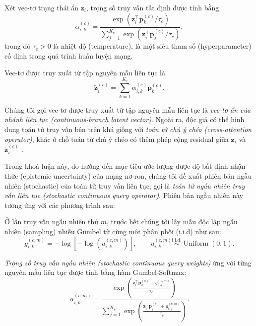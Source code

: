 Xét vec-tơ trạng thái ẩn \(\mathbf{z}_{i}\), trọng số truy vấn tất định được tính bằng
\begin{equation}
\alpha^{(c)}_{i,k}
=
\frac{
\exp\left(
\mathbf{z}_{i}^{\top}\mathbf{p}^{(c)}_k/\tau_c
\right)}
{
\sum_{j=1}^{K_c}
\exp\left(
\mathbf{z}_{i}^{\top}\mathbf{p}^{(c)}_j/\tau_c
\right)
},
\end{equation}
trong đó \(\tau_c>0\) là nhiệt độ (temperature), là một siêu tham số (hyperparameter) cố định trong quá trình huấn luyện mạng.

Vec-tơ được truy xuất từ tập nguyên mẫu liên tục là
\begin{equation}
\widetilde{\mathbf{z}}^{(c)}_{i}
=
\sum_{k=1}^{K_c}
\alpha^{(c)}_{i,k}\mathbf{p}^{(c)}_k.
\end{equation}

Chúng tôi gọi vec-tơ được truy xuất từ tập nguyên mẫu liên tục là \textit{vec-tơ ẩn của nhánh liên tục (continuous-branch latent vector)}. Ngoài ra, độc giả có thể hình dung toán tử truy vấn bên trên khá giống với \textit{toán tử chú ý chéo (cross-attention operator)}, khác ở chỗ toán tử chú ý chéo có thêm phép cộng residual giữa \(\mathbf{z}_{i}\) và \(\widetilde{\mathbf{z}}^{(c)}_{i}\) \cite{3295222.3295349} \cite{9859720}.

Trong khoá luận này, do hướng đến mục tiêu ước lượng được độ bất định nhận thức (epistemic uncertainty) của mạng nơ-ron, chúng tôi đề xuất phiên bản ngẫu nhiên (stochastic) của toán tử truy vấn liên tục, gọi là \textit{toán tử ngẫu nhiên truy vấn liên tục (stochastic continuous query operator)}. Phiên bản ngẫu nhiên này tương ứng với các phương trình sau:

Ở lần truy vấn ngẫu nhiên thứ \(m\), trước hết chúng tôi lấy mẫu độc lập ngẫu nhiên (sampling) nhiễu Gumbel từ cùng một phân phối (i.i.d) như sau:
\begin{equation}
g^{(c,m)}_{i,k}
=
-\log\left[-\log\left(u^{(c,m)}_{i,k}\right)\right],
\qquad
u^{(c,m)}_{i,k}
\overset{\mathrm{i.i.d.}}{\sim}
\operatorname{Uniform}(0,1).
\end{equation}

\textit{Trọng số truy vấn ngẫu nhiên (stochastic continuous query weights)} ứng với từng nguyên mẫu liên tục được tính bằng hàm Gumbel-Softmax:
\begin{equation}
\alpha^{(c,m)}_{i,k}
=
\frac{
\exp\left(
\frac{
\mathbf{z}_{i}^{\top}\mathbf{p}^{(c)}_k
+
g^{(c,m)}_{i,k}
}{\tau_c}
\right)}
{
\displaystyle
\sum_{j=1}^{K_c}
\exp\left(
\frac{
\mathbf{z}_{i}^{\top}\mathbf{p}^{(c)}_j
+
g^{(c,m)}_{i,j}
}{\tau_c}
\right)
}.
\end{equation}

